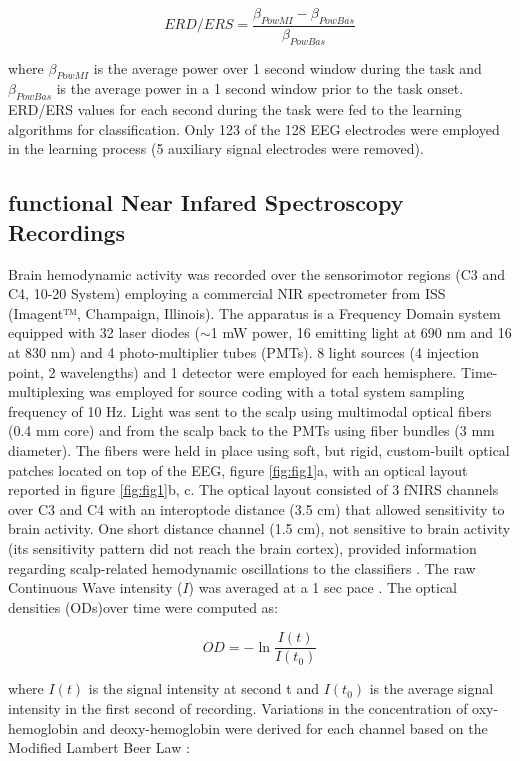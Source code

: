 \documentclass[12pt ]{iopart}
\begin{document}
\begin{equation}
\label{eqn:erders}
ERD/ERS=\frac{\beta_{PowMI}-\beta_{PowBas}}{\beta_{PowBas}}
\end{equation} 

where $\beta_{PowMI}$ is the average power over 1 second window during the task and $\beta_{PowBas}$ is the average power in a 1 second window prior to the task onset.
ERD/ERS values for each second during the task were fed to the learning algorithms for classification. Only 123 of the 128 EEG electrodes were employed in the learning process (5 auxiliary signal electrodes were removed).

\subsection{functional Near Infared Spectroscopy Recordings}
Brain hemodynamic activity was recorded over the sensorimotor regions (C3 and C4, 10-20 System) employing a commercial NIR spectrometer from ISS (Imagent™, Champaign, Illinois).
The apparatus is a Frequency Domain system equipped with 32 laser diodes ($\sim$1 mW  power, 16 emitting light at 690 nm and 16 at 830 nm) and 4 photo-multiplier tubes (PMTs). 
8 light sources (4 injection point, 2 wavelengths) and 1 detector were employed for each hemisphere. Time-multiplexing was employed for source coding with a total system sampling frequency of 10 Hz.  Light was sent to the scalp using multimodal optical fibers (0.4 mm core) and from the scalp back to the PMTs using fiber bundles (3 mm diameter).  The fibers were held in place using soft, but rigid, custom-built optical patches located on top of the EEG, figure \ref{fig:fig1}a, with an optical layout reported in figure \ref{fig:fig1}b, c. The optical layout consisted of 3 fNIRS channels over C3 and C4 with an interoptode distance (3.5 cm) that allowed sensitivity to brain activity. One short distance channel (1.5 cm),  not sensitive to brain activity (its sensitivity pattern did not reach the brain cortex), provided information regarding scalp-related hemodynamic oscillations to the classifiers \parencite{gagnon2014further}.  
The raw Continuous Wave intensity ($I$)  was averaged  at a 1 sec pace .
The optical densities (ODs)over time were computed as:

\begin{equation}
\label{eqn:erders}
OD=-\ln\frac{I(t)}{I(t_{0})}
\end{equation} 

where $I(t)$ is the signal intensity at second t and $I(t_{0})$ is the average signal intensity in the first second of recording.
Variations in the concentration of oxy-hemoglobin and deoxy-hemoglobin were derived for each channel  based on the Modified Lambert Beer Law \parencite{sassaroli2004comment}:
\end{document}
